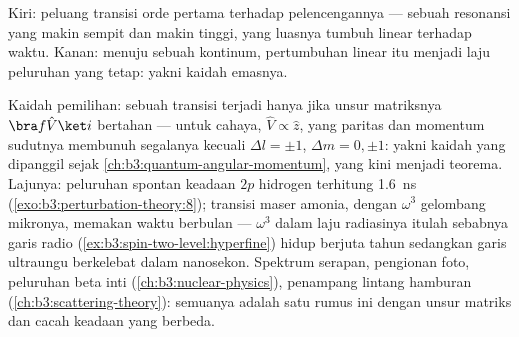 \begin{omfigure}

{\small Kiri: peluang transisi orde pertama terhadap pelencengannya ---
sebuah resonansi yang makin sempit dan makin tinggi, yang luasnya tumbuh
linear terhadap waktu. Kanan: menuju sebuah kontinum, pertumbuhan linear
itu menjadi laju peluruhan yang tetap: yakni kaidah emasnya.}
\end{omfigure}

\begin{example}\label{ex:b3:perturbation-theory:applications}
Kaidah pemilihan: sebuah transisi terjadi hanya jika unsur matriksnya
$\bra f\hat V\ket i$ bertahan --- untuk cahaya, $\hat V \propto \hat
z$, yang paritas dan momentum sudutnya membunuh segalanya kecuali
$\Delta l = \pm1$, $\Delta m = 0, \pm1$: yakni kaidah yang dipanggil
sejak \cref{ch:b3:quantum-angular-momentum}, yang kini menjadi teorema.
Lajunya: peluruhan spontan keadaan $2p$ hidrogen terhitung
\qty{1.6}{ns} (\cref{exo:b3:perturbation-theory:8}); transisi maser
amonia, dengan $\omega^3$ gelombang mikronya, memakan waktu berbulan
--- $\omega^3$ dalam laju radiasinya itulah sebabnya garis radio
(\cref{ex:b3:spin-two-level:hyperfine}) hidup berjuta tahun sedangkan
garis ultraungu berkelebat dalam nanosekon. Spektrum serapan,
pengionan foto, peluruhan beta inti
(\cref{ch:b3:nuclear-physics}), penampang lintang hamburan
(\cref{ch:b3:scattering-theory}): semuanya adalah satu rumus ini dengan
unsur matriks dan cacah keadaan yang berbeda.
\end{example}

